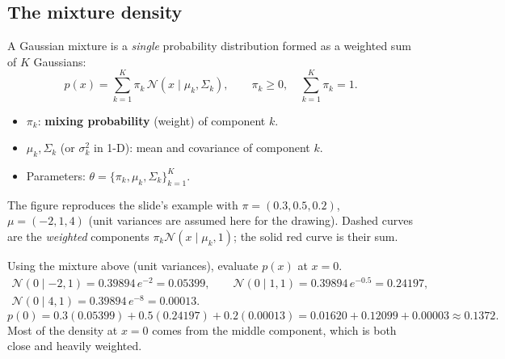 \documentclass[11pt,a4paper]{article}
\newcommand{\N}{\mathcal{N}}
\begin{document}
\subsection{The mixture density}

A Gaussian mixture is a \emph{single} probability distribution formed as a weighted sum of $K$ Gaussians:
\[
\boxed{\;p(x)=\sum_{k=1}^K \pi_k\,\N(x\mid\mu_k,\Sigma_k),\qquad \pi_k\ge 0,\quad \sum_{k=1}^K\pi_k=1.\;}
\]
\begin{itemize}[nosep]
\item $\pi_k$: \textbf{mixing probability} (weight) of component $k$.
\item $\mu_k,\Sigma_k$ (or $\sigma_k^2$ in 1-D): mean and covariance of component $k$.
\item Parameters: $\theta=\{\pi_k,\mu_k,\Sigma_k\}_{k=1}^K$.
\end{itemize}

The figure reproduces the slide's example with $\pi=(0.3,0.5,0.2)$, $\mu=(-2,1,4)$ (unit variances are assumed here for the drawing). Dashed curves are the \emph{weighted} components $\pi_k\N(x\mid\mu_k,1)$; the solid red curve is their sum.

\begin{center}
\end{center}

\begin{example}
Using the mixture above (unit variances), evaluate $p(x)$ at $x=0$.
\begin{gather*}
\N(0\mid-2,1)=0.39894\,e^{-2}=0.05399,\qquad
\N(0\mid 1,1)=0.39894\,e^{-0.5}=0.24197,\\
\N(0\mid 4,1)=0.39894\,e^{-8}=0.00013.
\end{gather*}
\[
p(0)=0.3(0.05399)+0.5(0.24197)+0.2(0.00013)=0.01620+0.12099+0.00003\approx\mathbf{0.1372}.
\]
Most of the density at $x=0$ comes from the middle component, which is both close and heavily weighted.
\end{example}
\end{document}
